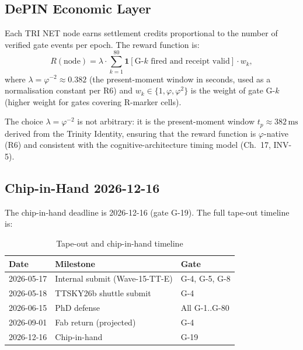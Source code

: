 \subsection{DePIN Economic Layer}
\label{sec74:depin-economics}

Each TRI NET node earns settlement credits proportional to the number of
verified gate events per epoch.  The reward function is:
\[
  R(\text{node}) = \lambda \cdot \sum_{k=1}^{80}
    \mathbf{1}[\text{G-}k \text{ fired and receipt valid}] \cdot w_k,
\]
where $\lambda = \varphi^{-2} \approx 0.382$ (the present-moment window
in seconds, used as a normalisation constant per R6) and
$w_k \in \{1, \varphi, \varphi^{2}\}$ is the weight of gate G-$k$
(higher weight for gates covering R-marker cells).

\begin{remark}
The choice $\lambda = \varphi^{-2}$ is not arbitrary: it is the
present-moment window $t_{p} \approx 382\,\text{ms}$ derived from the
Trinity Identity, ensuring that the reward function is $\varphi$-native
(R6) and consistent with the cognitive-architecture timing model
(Ch.~17, INV-5).
\end{remark}

\subsection{Chip-in-Hand 2026-12-16}
\label{sec74:chip-deadline}

The chip-in-hand deadline is 2026-12-16 (gate G-19).  The full tape-out
timeline is:

\begin{table}[H]
\centering
\caption{Tape-out and chip-in-hand timeline}
\label{tab74:timeline}
\small
\begin{tabular}{lll}
\toprule
Date & Milestone & Gate \\
\midrule
2026-05-17 & Internal submit (Wave-15-TT-E) & G-4, G-5, G-8 \\
2026-05-18 & TTSKY26b shuttle submit        & G-4 \\
2026-06-15 & PhD defense                   & All G-1..G-80 \\
2026-09-01 & Fab return (projected)        & G-4 \\
2026-12-16 & Chip-in-hand                  & G-19 \\
\bottomrule
\end{tabular}
\end{table}

